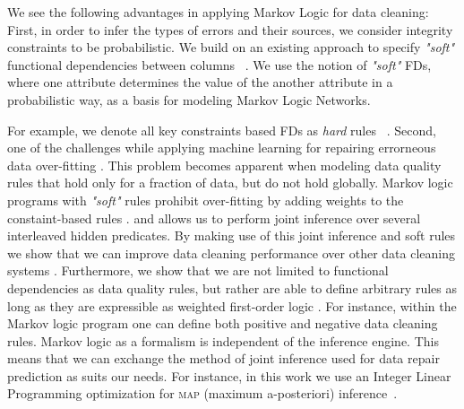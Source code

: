 We see the following advantages in applying Markov Logic for data cleaning: First, in order to infer the types of errors and their sources, we consider integrity constraints to be probabilistic. We build on an existing approach to specify \textit{"soft"} functional dependencies between columns~\cite{Ilyas:2004:CAD:1007568.1007641} .  We use the notion of \textit{"soft"} FDs, where one attribute determines the value of the another attribute in a probabilistic way, as a basis for modeling Markov Logic Networks.  

 For example, we denote all key constraints based FDs as \textit{hard} rules~\cite{bertossi2011database} . Second, one of the challenges while applying machine learning for repairing errorneous data over-fitting . This problem becomes apparent when modeling data quality rules that hold only for a fraction of data, but do not hold globally. Markov logic programs with \textit{"soft"} rules prohibit over-fitting by adding weights to the constaint-based rules .  and allows us to perform joint inference over several interleaved hidden predicates. By making use of this joint inference and soft rules we show that we can improve data cleaning performance over other data cleaning systems . Furthermore, we show that we are not limited to functional dependencies as data quality rules, but rather are able to define arbitrary rules as long as they are expressible as weighted first-order logic . For instance, within the Markov logic program one can define both positive and negative data cleaning rules. Markov logic as a formalism is independent of the inference engine. This means that we can exchange the method of joint inference used for data repair prediction as suits our needs. For instance, in this work we use an Integer Linear Programming optimization for \textsc{map} (maximum a-posteriori) inference~\cite{NoessnerNS13}. 
    
